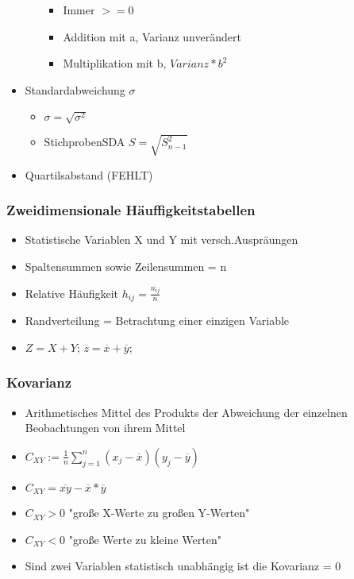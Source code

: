 \documentclass[a4paper]{article}
\begin{document}
\begin{landscape}
\begin{multicols}{4}
\begin{itemize}[noitemsep,nolistsep,leftmargin=*]
\begin{itemize}[noitemsep,nolistsep,leftmargin=*]
\begin{itemize}[noitemsep,nolistsep,leftmargin=*]
                    \item Immer $>= 0$
                    \item Addition mit a, Varianz unverändert
                    \item Multiplikation mit b, $Varianz * b^2$
                \end{itemize}
        \end{itemize}
        \item Standardabweichung $\sigma$
        \begin{itemize}[noitemsep,nolistsep,leftmargin=*]
            \item $\sigma = \sqrt{\sigma^2}$
            \item StichprobenSDA $S = \sqrt{S^2_{n-1}}$
        \end{itemize}
        \item Quartilsabstand (FEHLT)
    \end{itemize}

    \subsubsection*{Zweidimensionale Häuffigkeitstabellen}
    \begin{itemize}[noitemsep,nolistsep,leftmargin=*]
        \item Statistische Variablen X und Y mit versch.Auspräungen
        \item Spaltensummen sowie Zeilensummen = n
        \item Relative Häufigkeit $h_{ij} = \frac{n_{ij}}{n}$
        \item Randverteilung = Betrachtung einer einzigen Variable
        \item $ Z = X +Y$; $\overline{z} = \overline{x} + \overline{y}$; 
    \end{itemize}

    \subsubsection*{Kovarianz}
    \begin{itemize}[noitemsep,nolistsep,leftmargin=*]
        \item Arithmetisches Mittel des Produkts der Abweichung der einzelnen Beobachtungen von ihrem Mittel
        \item $C_{XY} := \frac{1}{n}\sum_{j = 1}^{n}{(x_j - \overline{x})(y_j - \overline{y})}$ 
        \item $C_{XY} = \overline{xy} - \overline{x}*\overline{y}$
        \item  $C_{XY} > 0$ "große X-Werte zu großen Y-Werten"
        \item $C_{XY} < 0$ "große Werte zu kleine Werten"
        \item Sind zwei Variablen statistisch unabhängig ist die Kovarianz = 0
    \end{itemize}


\end{multicols}
\end{landscape}
\end{document}
